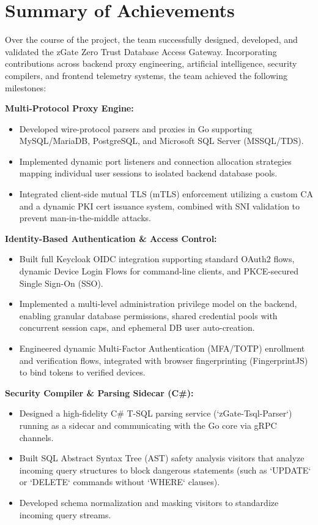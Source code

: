 \section{Summary of Achievements}

Over the course of the project, the team successfully designed, developed, and validated the zGate Zero Trust Database Access Gateway. Incorporating contributions across backend proxy engineering, artificial intelligence, security compilers, and frontend telemetry systems, the team achieved the following milestones:

\textbf{Multi-Protocol Proxy Engine:}
\begin{itemize}
    \item Developed wire-protocol parsers and proxies in Go supporting MySQL/MariaDB, PostgreSQL, and Microsoft SQL Server (MSSQL/TDS).
    \item Implemented dynamic port listeners and connection allocation strategies mapping individual user sessions to isolated backend database pools.
    \item Integrated client-side mutual TLS (mTLS) enforcement utilizing a custom CA and a dynamic PKI cert issuance system, combined with SNI validation to prevent man-in-the-middle attacks.
\end{itemize}

\textbf{Identity-Based Authentication \& Access Control:}
\begin{itemize}
    \item Built full Keycloak OIDC integration supporting standard OAuth2 flows, dynamic Device Login Flows for command-line clients, and PKCE-secured Single Sign-On (SSO).
    \item Implemented a multi-level administration privilege model on the backend, enabling granular database permissions, shared credential pools with concurrent session caps, and ephemeral DB user auto-creation.
    \item Engineered dynamic Multi-Factor Authentication (MFA/TOTP) enrollment and verification flows, integrated with browser fingerprinting (FingerprintJS) to bind tokens to verified devices.
\end{itemize}

\textbf{Security Compiler \& Parsing Sidecar (C\#):}
\begin{itemize}
    \item Designed a high-fidelity C\# T-SQL parsing service (`zGate-Tsql-Parser`) running as a sidecar and communicating with the Go core via gRPC channels.
    \item Built SQL Abstract Syntax Tree (AST) safety analysis visitors that analyze incoming query structures to block dangerous statements (such as `UPDATE` or `DELETE` commands without `WHERE` clauses).
    \item Developed schema normalization and masking visitors to standardize incoming query streams.
\end{itemize}

